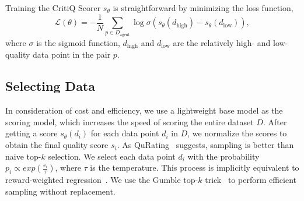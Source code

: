 Training the CritiQ Scorer $s_{\theta}$ is straightforward by minimizing the loss
function,
\[
    \mathcal{L}(\theta) = - \frac{1}{N}\sum_{p \in D_{\text{agent}}}\log\sigma (s
    _{\theta}(d_{\text{high}}) - s_{\theta}(d_{\text{low}})),
\]
where $\sigma$ is the sigmoid function, $d_{\text{high}}$ and $d_{\text{low}}$ are
the relatively high- and low- quality data point in the pair $p$.

\subsection{Selecting Data}

In consideration of cost and efficiency, we use a lightweight base model as the scoring
model, which increases the speed of scoring the entire dataset $D$. After getting
a score $s_{\theta}(d_{i})$ for each data point $d_{i}$ in $D$, we normalize the
scores to obtain the final quality score $s_{i}$. As QuRating~\citep{wettig_qurating_2024}
suggests, sampling is better than naive top-$k$ selection. We select each data
point $d_{i}$ with the probability $p_{i}\propto exp(\frac{s_{i}}{\tau})$, where $\tau$
is the temperature. This process is implicitly equivalent to reward-weighted
regression~\citep{wettig_qurating_2024,korbak_pretraining_2023,peters_reinforcement_2007}.
We use the Gumble top-$k$ trick~\citep{wettig_qurating_2024,kool_stochastic_2019}
to perform efficient sampling without replacement.
